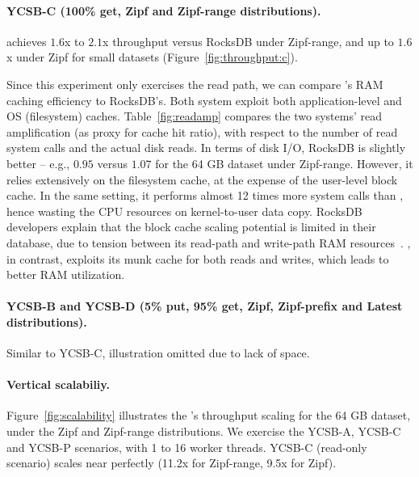 \paragraph{YCSB-C (100\% get, Zipf and Zipf-range distributions).}  
\sys\/ achieves $1.6$x to $2.1$x throughput versus RocksDB under Zipf-range,
and up to $1.6$x under Zipf for small datasets (Figure~\ref{fig:throughput:c}).   

Since this experiment only exercises the read path, we can compare \sys's RAM caching 
efficiency to RocksDB's. Both system exploit both application-level and OS (filesystem) caches. 
Table~\ref{fig:readamp} compares the two systems' read amplification (as proxy for cache hit ratio), 
with respect to the number of read system calls and the actual disk reads.  In terms of disk I/O, RocksDB 
is slightly better -- e.g., $0.95$ versus $1.07$ for the 64 GB dataset under Zipf-range. However, it 
relies extensively on the filesystem cache, at the expense of the user-level block cache. In the same
setting, it performs almost 12 times more system calls than \sys, hence wasting the CPU resources on  
kernel-to-user data copy. RocksDB developers explain that the block cache scaling potential is limited in their
database, due to tension between its read-path and write-path RAM resources~\cite{RocksDB-default-blockcache-issue}. 
\sys, in contrast, exploits its munk cache for both reads and writes, which leads to better RAM utilization. 

\paragraph{YCSB-B and YCSB-D (5\% put, 95\% get, Zipf, Zipf-prefix and Latest distributions).} Similar to YCSB-C, 
illustration omitted due to lack of space. 



\paragraph{Vertical scalabiliy.} 
Figure~\ref{fig:scalability} illustrates the \sys's throughput scaling for the 64 GB dataset, under the Zipf and Zipf-range 
distributions. We exercise the YCSB-A, YCSB-C and YCSB-P scenarios, with 1 to 16 worker threads.  
YCSB-C (read-only scenario) scales near perfectly (11.2x for Zipf-range, 9.5x for Zipf). 

